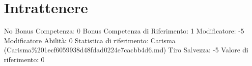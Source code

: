 \section{Intrattenere}\label{intrattenere}

\begin{description}
\tightlist
\item[Tags: ABI]
No Bonus Competenza: 0 Bonus Competenza di Riferimento: 1 Modificatore:
-5 Modificatore Abilità: 0 Statistica di riferimento: Carisma
(Carisma\%201ecf6059938d48fdad0224e7cacbb4d6.md) Tiro Salvezza: -5
Valore di riferimento: 0
\end{description}
